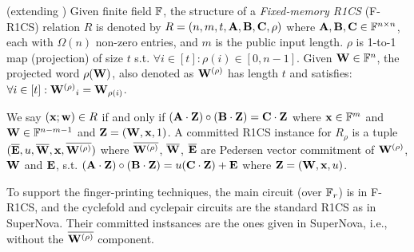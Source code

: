 
\begin{definition} (extending \cite[Definition 12]{Nova})
Given finite field $\mathbb{F}$, the structure of a 
{\em Fixed-memory R1CS} (F-R1CS) relation $R$ is denoted by 
$R = (n, m, t, {{\mathbf {A}}}, {{\mathbf {B}}}, {{\mathbf {C}}}, \rho)$ 
where ${{\mathbf {A}}}, {{\mathbf {B}}}, {{\mathbf {C}}} \in \mathbb{F}^{n\times n}$, 
each with $\Omega(n)$ non-zero entries,
and $m$ is the public input length.  $\rho$ is 1-to-1 map (projection) of 
size $t$ s.t. $\forall i\in [t]: \rho(i) \in [0,n-1]$.
Given ${{\mathbf {W}}} \in \mathbb{F}^n$, 
the projected word $\rho({{\mathbf {W}}})$, also 
denoted as ${{\mathbf {W^{(\rho)}}}}$ has length $t$ and
satisfies: $\forall i \in [t]: {{\mathbf {W^{(\rho)}}}}_i = {{\mathbf {W}}}_{\rho(i)}$.

We say $({{\mathbf {x}}};{{\mathbf {w}}}) \in R$ if and only if
$({{\mathbf {A}}} \cdot {{\mathbf {Z}}}) \circ ({{\mathbf {B}}} \cdot {{\mathbf {Z}}}) = 
{{\mathbf {C}}} \cdot {{\mathbf {Z}}}$ where
${{\mathbf {x}}}\in \mathbb{F}^m$ and ${{\mathbf {W}}} \in \mathbb{F}^{n-m-1}$ and ${{\mathbf {Z}}} = 
({{\mathbf {W}}},{{\mathbf {x}}},1)$. 
A committed R1CS instance for $R_\rho$ is a tuple 
$(\overline{{{\mathbf {E}}}}, u,
\overline{{{\mathbf {W}}}}, {{\mathbf {x}}}, \overline{{{\mathbf {{{\mathbf {W}}}^{(\rho)}}}}})$
where $\overline{{{\mathbf {W}}}^{(\rho)}}$,
$\overline{{{\mathbf {W}}}}$, $\overline{{{\mathbf {E}}}}$ are Pedersen vector
commitment of ${{\mathbf {W^{(\rho)}}}}$, ${{\mathbf {W}}}$ and ${{\mathbf {E}}}$,
s.t. $({{\mathbf {A}}}\cdot {{\mathbf {Z}}})\circ ({{\mathbf {B}}} \cdot {{\mathbf {Z}}}) = u({{\mathbf {C}}}\cdot {{\mathbf {Z}}}) + {{\mathbf {E}}}$ where 
${{\mathbf {Z}}} = ({{\mathbf {W}}}, {{\mathbf {x}}}, u)$.
\end{definition}

To support the finger-printing techniques, the main circuit (over $\mathbb{F}_r$)
is in F-R1CS, and the cyclefold and cyclepair circuits are the
standard R1CS as in SuperNova. Their committed instsances are
the ones given in SuperNova, i.e., without the $\overline{{{\mathbf {W}}}^{(\rho)}}$
component.

